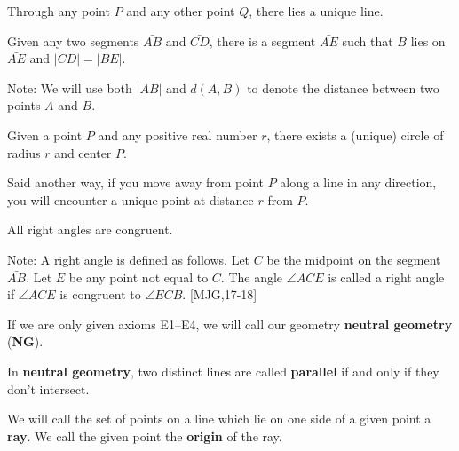 \documentclass[instructornotes]{ximera}
\begin{document}
\begin{axiom}[E1]
Through any point $P$ and any other point $Q$, there lies a unique
line.
\end{axiom}

\begin{axiom}[E2] 
Given any two segments $\bar{AB}$ and $\bar{CD}$, there is a
segment $\bar{AE}$ such that $B$ lies on $\bar{AE}$ and
$\left\vert CD\right\vert =\left\vert BE\right\vert$.

Note: We will use both $\left\vert AB\right\vert$ and $d(A,B)$ to
denote the distance between two points $A$ and $B$.
\end{axiom}

\begin{axiom}[E3]
Given a point $P$ and any positive real number $r$, there exists a
(unique) circle of radius $r$ and center $P$. 

Said another way, if you move away from point $P$ along a line in any
direction, you will encounter a unique point at distance $r$ from $P$.
\end{axiom}

\begin{axiom}[E4]
All right angles are congruent.

Note: A right angle is defined as follows. Let $C$ be the midpoint on
the segment $\bar{AB}$. Let $E$ be any point not equal to
$C$. The angle $\angle ACE$ is called a right angle if $\angle ACE$ is
congruent to $\angle ECB$. [MJG,17-18]
\end{axiom}

\begin{definition}
If we are only given axioms E1--E4, we will call our
geometry \textbf{neutral geometry} (\textbf{NG}).
\end{definition}

\begin{definition}
In \textbf{neutral geometry}, two distinct lines are called \textbf{parallel} if and
only if they don't intersect.
\end{definition}



\begin{definition} 
We will call the set of points on a line which lie on one side of a
given point a \textbf{ray}.  We call the given point the
\textbf{origin} of the ray.
\end{definition}
\end{document}
